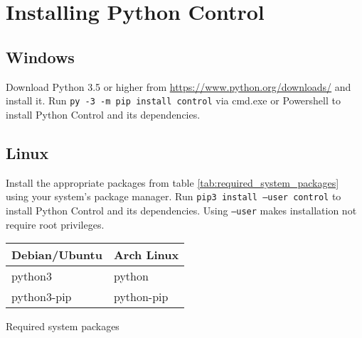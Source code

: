\chapter{Installing Python Control} \label{ch:installing_python_control}

\section{Windows}

Download Python 3.5 or higher from \url{https://www.python.org/downloads/} and
install it. Run \texttt{py -3 -m pip install control} via cmd.exe or Powershell
to install Python Control and its dependencies.

\section{Linux}

Install the appropriate packages from table \ref{tab:required_system_packages}
using your system's package manager. Run \texttt{pip3 install --user control} to
install Python Control and its dependencies. Using \texttt{--user} makes
installation not require root privileges.

\begin{booktable}
  \begin{tabular}{|ll|}
    \hline
    \rowcolor{headingbg}
    \textbf{Debian/Ubuntu} & \textbf{Arch Linux} \\
    \hline
    python3 & python \\
    python3-pip & python-pip \\
    \hline
  \end{tabular}
  \caption{Required system packages}
  \label{tab:required_system_packages}
\end{booktable}
